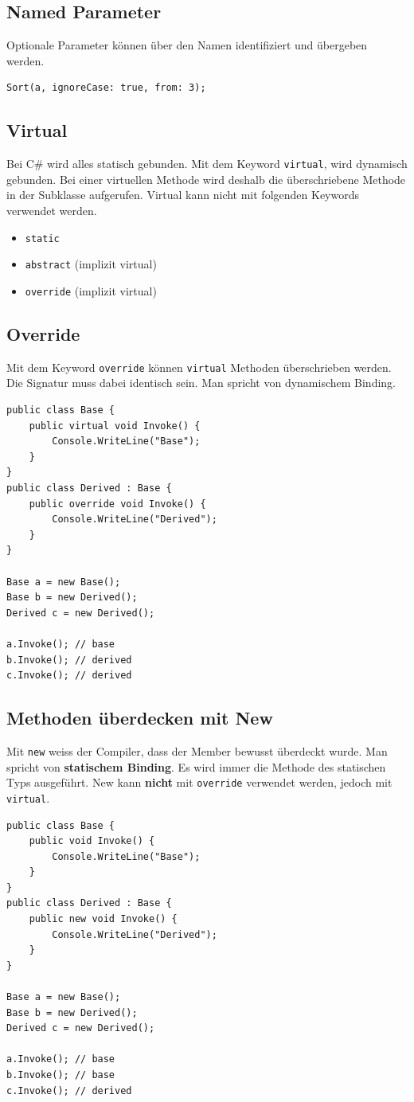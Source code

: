 \documentclass[
a4paper,
oneside,
10pt,
fleqn,
headsepline,
toc=listofnumbered, 
bibliography=totocnumbered]{scrartcl}
\begin{document}
\subsection{Named Parameter}
Optionale Parameter können über den Namen identifiziert und übergeben werden.
\begin{lstlisting}
Sort(a, ignoreCase: true, from: 3);
\end{lstlisting}

\subsection{Virtual}
Bei C\# wird alles statisch gebunden. Mit dem Keyword \lstinline|virtual|, wird dynamisch gebunden. Bei einer virtuellen Methode wird deshalb die überschriebene Methode in der Subklasse aufgerufen. Virtual kann nicht mit folgenden Keywords verwendet werden.
\begin{itemize}
	\item \lstinline|static|
	\item \lstinline|abstract| (implizit virtual)
	\item \lstinline|override| (implizit virtual)
\end{itemize} 

\subsection{Override}
Mit dem Keyword \lstinline|override| können \lstinline|virtual| Methoden überschrieben werden. Die Signatur muss dabei identisch sein. Man spricht von dynamischem Binding.


\begin{lstlisting}
public class Base {
	public virtual void Invoke() {
		Console.WriteLine("Base");
	}
}
public class Derived : Base {
	public override void Invoke() {
		Console.WriteLine("Derived");
	}
}

Base a = new Base();
Base b = new Derived();
Derived c = new Derived();

a.Invoke(); // base
b.Invoke(); // derived
c.Invoke(); // derived
\end{lstlisting}

\subsection{Methoden überdecken mit New}
Mit \lstinline|new| weiss der Compiler, dass der Member bewusst überdeckt wurde. Man spricht von \textbf{statischem Binding}. Es wird immer die Methode des statischen Typs ausgeführt. New kann \textbf{nicht} mit \lstinline|override| verwendet werden, jedoch mit \lstinline|virtual|.
\begin{lstlisting} 
public class Base {
	public void Invoke() {
		Console.WriteLine("Base");
	}
}
public class Derived : Base {
	public new void Invoke() {
		Console.WriteLine("Derived");
	}
}

Base a = new Base();
Base b = new Derived();
Derived c = new Derived();

a.Invoke(); // base
b.Invoke(); // base
c.Invoke(); // derived
\end{lstlisting}
\end{document}
